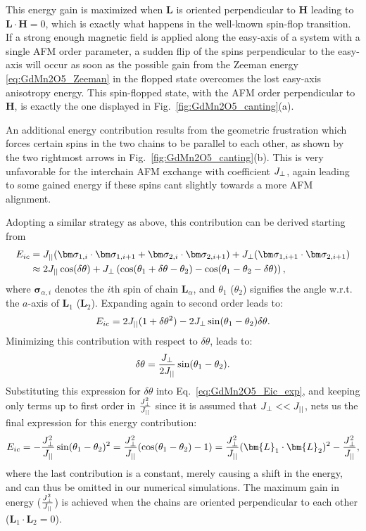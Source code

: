 This energy gain is maximized when $\bm{L}$ is oriented perpendicular to $\bm{H}$ leading to $\bm L \cdot \bm H = 0$, which is exactly what happens in the well-known spin-flop transition.
If a strong enough magnetic field is applied along the easy-axis of a system with a single \gls{AFM} order parameter, a sudden flip of the spins perpendicular to the easy-axis will occur as soon as the possible gain from the Zeeman energy \eqref{eq:GdMn2O5_Zeeman} in the flopped state overcomes the lost easy-axis anisotropy energy. This spin-flopped state, with the \gls{AFM} order perpendicular to $\bm{H}$, is exactly the one displayed in Fig.~\ref{fig:GdMn2O5_canting}(a).

An additional energy contribution results from the geometric frustration which forces certain spins in the two chains to be parallel to each other, as shown by the two rightmost arrows in Fig.~\ref{fig:GdMn2O5_canting}(b).
This is very unfavorable for the interchain \gls{AFM} exchange with coefficient $J_{\perp}$, again leading to some gained energy if these spins cant slightly towards a more \gls{AFM} alignment.

Adopting a similar strategy as above, this contribution can be derived starting from
\begin{align}
	E_{ic} &= \Jpar (\bm \sigma_{1, i} \cdot \bm \sigma_{1, i+1} + \bm \sigma_{2, i} \cdot \bm \sigma_{2, i+1}) + \Jperp(\bm \sigma_{1, i+1} \cdot \bm \sigma_{2,i+1}) \\
	 &\approx 2 \Jpar \cos(\delta \theta) + \Jperp \left(\cos(\theta_1 + \delta \theta - \theta_2) - \cos(\theta_1 - \theta_2 -\delta \theta)\right),
\end{align}
where $\bm \sigma_{\alpha, i}$ denotes the $i$th spin of chain $\bm L_\alpha$, and $\theta_1$ ($\theta_2$) signifies the angle w.r.t. the $a$-axis of $\bm{L}_1$ ($\bm{L}_2$).
Expanding again to second order leads to:
\begin{equation}
	E_{ic} = 2 J_{||} ( 1+ \delta \theta^2) - 2 J_{\perp} \sin(\theta_1 - \theta_2)\delta \theta. \label{eq:GdMn2O5_Eic_exp}
\end{equation}
Minimizing this contribution with respect to $\delta \theta$, leads to:
\begin{equation}
	\delta \theta = \frac{J_{\perp}}{2 J_{||}} \sin(\theta_1 - \theta_2).
\end{equation}
Substituting this expression for $\delta \theta$ into Eq.~\eqref{eq:GdMn2O5_Eic_exp}, and keeping only terms up to first order in $\frac{J_{\perp}^2}{J_{||}}$ since it is assumed that $J_{\perp} << J_{||}$, nets us the final expression for this energy contribution:
\begin{equation}
	E_{ic} = -\frac{\Jperp^2}{\Jpar}\sin(\theta_1 - \theta_2)^2 =  \frac{\Jperp^2}{\Jpar}(\cos(\theta_1 - \theta_2) - 1) = \frac{\Jperp^2}{\Jpar}(\bm{L}_1 \cdot \bm{L}_2)^2 - \frac{\Jperp^2}{\Jpar},
\end{equation}
where the last contribution is a constant, merely causing a shift in the energy, and can thus be omitted in our numerical simulations.
The maximum gain in energy ($\frac{J_{\perp}^2}{J_{||}}$) is achieved when the chains are oriented perpendicular to each other ($\bm L_1 \cdot \bm L_2 = 0$).

